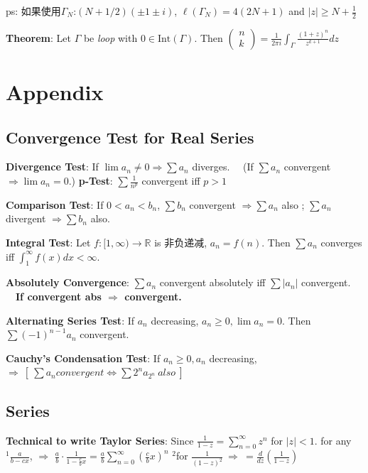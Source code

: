 \documentclass[9pt]{article}
\begin{document}
\quad ps: 如果使用$\Gamma_N$:$(N+1/2)(\pm1\pm i)$, $\ell(\Gamma_N)=4(2N+1)$ and $|z|\geq N+\frac{1}{2}$

\textbf{Theorem}: Let $\Gamma$ be \textit{loop} with $0\in\text{Int}(\Gamma)$. Then $\begin{pmatrix}n \\ k\end{pmatrix}=\frac{1}{2\pi i}\int_\Gamma\frac{(1+z)^n}{z^{k+1}}dz$


\section{Appendix}

\subsection{Convergence Test for Real Series} %

\textbf{Divergence Test}: If $\lim a_n\ne 0 \Rightarrow \sum a_n$ diverges. \ \ (If $\sum a_n$ convergent $\Rightarrow \lim a_n=0.$) \qquad \textbf{p-Test}: $\sum \frac{1}{n^p}$ convergent iff $p>1$

\textbf{Comparison Test}: If $0<a_n<b_n$, $\sum b_n$ convergent $\Rightarrow \sum a_n$ also ; $\sum a_n$ divergent $\Rightarrow \sum b_n$ also.

\textbf{Integral Test}: Let $f:[1,\infty)\rightarrow\mathbb{R}$ is 非负递减, $a_n=f(n)$. Then $\sum a_n$ converges iff $\int_{1}^{\infty}f(x)dx<\infty.$

\textbf{Absolutely Convergence}: $\sum a_n$ convergent absolutely iff $\sum |a_n|$ convergent. \ \ \textbf{If convergent abs $\Rightarrow$ convergent.}

\textbf{Alternating Series Test}: If $a_n$ decreasing, $a_n\geq 0,\lim a_n = 0$. Then $\sum (-1)^{n-1}a_n$ convergent.

\textbf{Cauchy's Condensation Test}: If $a_n\geq 0,a_n$ decreasing, $\Rightarrow \ [\ \sum a_n convergent \Leftrightarrow \sum 2^na_{2^n} \ also \ ]$


\subsection{Series}

\textbf{Technical to write Taylor Series}: {\scriptsize Since $\frac{1}{1-z}=\sum_{n=0}^{\infty}z^n$ for $|z|<1$. \quad for any $^1\frac{a}{b-cx}$, $\Rightarrow$ $\frac{a}{b}\cdot\frac{1}{1-\frac{c}{b}x}=\frac{a}{b}\sum_{n=0}^{\infty}\left(\frac{c}{b}x\right)^n$ \quad $^2$for $\frac{1}{(1-z)^2} \ \Rightarrow \ =\frac{d}{dz}\left(\frac{1}{1-z}\right)$}
\end{document}
